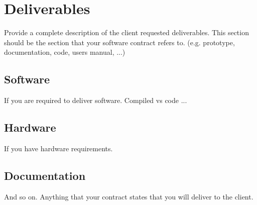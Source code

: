 \section{Deliverables}

Provide a complete description of the client requested deliverables.   This section should be the section that your software contract refers to.
(e.g. prototype, documentation, code, users manual, ...)


\subsection{Software}
If you are required to deliver software.  Compiled vs code ...

\subsection{Hardware}
If you have hardware requirements.

\subsection{Documentation}
And so on.  Anything that your contract states that you will deliver to the client.

